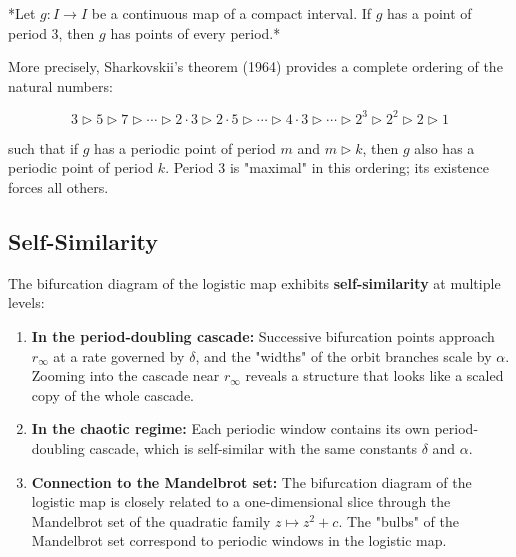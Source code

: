 \begin{theorem}[Li–Yorke]\label{thm:5.8}
*Let $g: I \to I$ be a continuous map of a compact interval. If $g$ has a point of period 3, then $g$ has points of every period.*

More precisely, Sharkovskii's theorem (1964) provides a complete ordering of the natural numbers:

\[
3 \triangleright 5 \triangleright 7 \triangleright \cdots \triangleright 2 \cdot 3 \triangleright 2 \cdot 5 \triangleright \cdots \triangleright 4 \cdot 3 \triangleright \cdots \triangleright 2^3 \triangleright 2^2 \triangleright 2 \triangleright 1
\]

such that if $g$ has a periodic point of period $m$ and $m \triangleright k$, then $g$ also has a periodic point of period $k$. Period 3 is "maximal" in this ordering; its existence forces all others.
\end{theorem}


\subsection{Self-Similarity}\label{sec:5.6.4}

The bifurcation diagram of the logistic map exhibits \textbf{self-similarity} at multiple levels:

\begin{enumerate}[nosep]
  \item \textbf{In the period-doubling cascade:} Successive bifurcation points approach $r_\infty$ at a rate governed by $\delta$, and the "widths" of the orbit branches scale by $\alpha$. Zooming into the cascade near $r_\infty$ reveals a structure that looks like a scaled copy of the whole cascade.

  \item \textbf{In the chaotic regime:} Each periodic window contains its own period-doubling cascade, which is self-similar with the same constants $\delta$ and $\alpha$.

  \item \textbf{Connection to the Mandelbrot set:} The bifurcation diagram of the logistic map is closely related to a one-dimensional slice through the Mandelbrot set of the quadratic family $z \mapsto z^2 + c$. The "bulbs" of the Mandelbrot set correspond to periodic windows in the logistic map.


\bigskip

\end{enumerate}

